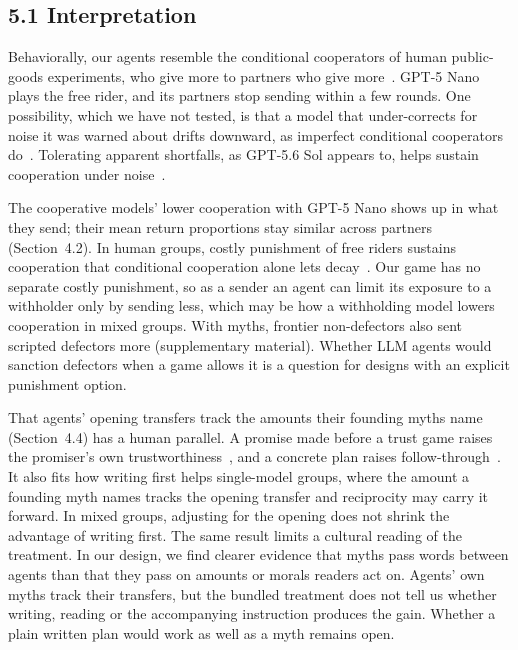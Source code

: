 \subsection{5.1 Interpretation}
\label{discussion-interpretation}

Behaviorally, our agents resemble the conditional cooperators of human public-goods experiments, who give more to partners who give more~\citep{fischbacher2001}. GPT-5 Nano plays the free rider, and its partners stop sending within a few rounds. One possibility, which we have not tested, is that a model that under-corrects for noise it was warned about drifts downward, as imperfect conditional cooperators do~\citep{fischbacher2010}. Tolerating apparent shortfalls, as GPT-5.6 Sol appears to, helps sustain cooperation under noise~\citep{wu1995}. %

The cooperative models' lower cooperation with GPT-5 Nano shows up in what they send; their mean return proportions stay similar across partners (Section~4.2). In human groups, costly punishment of free riders sustains cooperation that conditional cooperation alone lets decay~\citep{fehr2000,fehr2002,boyd2003}. Our game has no separate costly punishment, so as a sender an agent can limit its exposure to a withholder only by sending less, which may be how a withholding model lowers cooperation in mixed groups. With myths, frontier non-defectors also sent scripted defectors more (supplementary material). Whether LLM agents would sanction defectors when a game allows it is a question for designs with an explicit punishment option. %

That agents' opening transfers track the amounts their founding myths name (Section~4.4) has a human parallel. A promise made before a trust game raises the promiser's own trustworthiness~\citep{charness2006}, and a concrete plan raises follow-through~\citep{gollwitzer1999}. It also fits how writing first helps single-model groups, where the amount a founding myth names tracks the opening transfer and reciprocity may carry it forward. In mixed groups, adjusting for the opening does not shrink the advantage of writing first. The same result limits a cultural reading of the treatment. In our design, we find clearer evidence that myths pass words between agents than that they pass on amounts or morals readers act on. Agents' own myths track their transfers, but the bundled treatment does not tell us whether writing, reading or the accompanying instruction produces the gain. Whether a plain written plan would work as well as a myth remains open.

